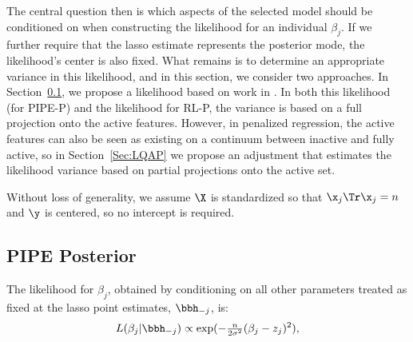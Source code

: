 
\noindent The central question then is which aspects of the selected model should be conditioned on when constructing the likelihood for an individual $\beta_j$. If we further require that the lasso estimate represents the posterior mode, the likelihood's center is also fixed. What remains is to determine an appropriate variance in this likelihood, and in this section, we consider two approaches. In Section~\ref{sec:pipep}, we propose a likelihood based on work in \cite{dai2019}. In both this likelihood (for PIPE-P) and the likelihood for RL-P, the variance is based on a full projection onto the active features. However, in penalized regression, the active features can also be seen as existing on a continuum between inactive and fully active, so in Section~\ref{Sec:LQAP} we propose an adjustment that estimates the likelihood variance based on partial projections onto the active set.



Without loss of generality, we assume $\X$ is standardized so that $\x_j \Tr \x_j = n$ and $\y$ is centered, so no intercept is required.

\subsection{PIPE Posterior}
\label{sec:pipep}

The likelihood for $\beta_j$, obtained by conditioning on all other parameters treated as fixed at the lasso point estimates, $\bbh_{-j}$, is:
$$ L(\beta_j|\bbh_{-j}) \propto \exp(-\tfrac{n}{2\sigma^2}(\beta_{j} - z_{j})^2), $$

